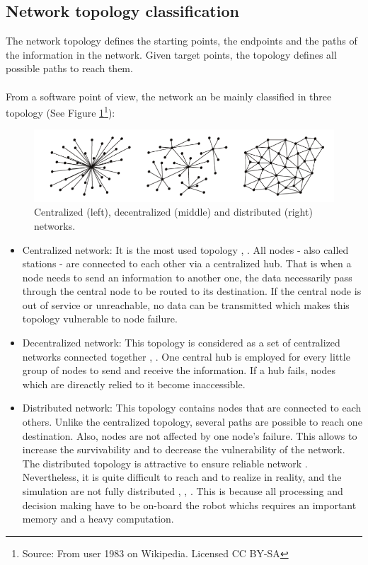 \documentclass[11pt,openany]{book}
\begin{document}
\subsection{Network topology classification}
The network topology defines the starting points, the endpoints and the paths of the information in the network. Given target points, the topology defines all possible paths to reach them.\\\\
From a software point of view, the network an be mainly classified in three topology (See Figure \ref{fig:4.2}\footnote{Source: From user 1983 on Wikipedia. Licensed CC BY-SA}):
\begin{figure}[H]
    \centering
    \includegraphics[scale=0.4]{assets/4_2.png}
    \caption{Centralized (left), decentralized (middle) and distributed (right) networks.}
    \label{fig:4.2}
\end{figure}
\begin{itemize}
    \item Centralized network: It is the most used topology \cite{morgenthaler2012uavnet}, \cite{forster2013collaborative}. All nodes - also called stations - are connected to each other via a centralized hub. That is when a node needs to send an information to another one, the data necessarily pass through the central node to be routed to its destination. If the central node is out of service or unreachable, no data can be transmitted which makes this topology vulnerable to node failure.
    \item Decentralized network: This topology is considered as a set of centralized networks connected together \cite{konolige2003map}, \cite{brand2014stereo}. One central hub is employed for every little group of nodes to send and receive the information. If a hub fails, nodes which are direactly relied to it become inaccessible.
    \item Distributed network: This topology contains nodes that are connected to each others. Unlike the centralized topology, several paths are possible to reach one destination. Also, nodes are not affected by one node's failure. This allows to increase the survivability and to decrease the vulnerability of the network. The distributed topology is attractive to ensure reliable network \cite{cunningham2010ddf}. Nevertheless, it is quite difficult to reach and to realize in reality, and the simulation are not fully distributed \cite{waharte2009coordinated}, \cite{cameron2009collaborative}, \cite{scherer2015autonomous}. This is because all processing and decision making have to be on-board the robot whichs requires an important memory and a heavy computation.
\end{itemize}
\end{document}
